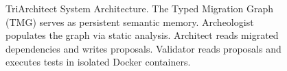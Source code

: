 \begin{figure}[t]
\caption{TriArchitect System Architecture. The Typed Migration Graph (TMG) 
serves as persistent semantic memory. Archeologist populates the graph via 
static analysis. Architect reads migrated dependencies and writes proposals. 
Validator reads proposals and executes tests in isolated Docker containers.}
\label{fig:architecture}
\end{figure}


